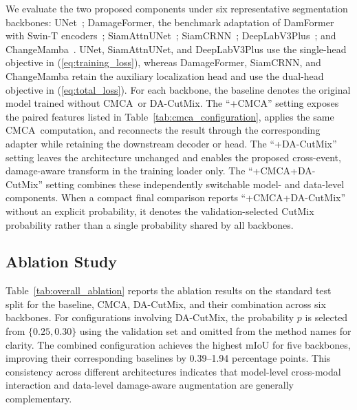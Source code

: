 \documentclass[journal]{IEEEtran}
\newcommand{\cmca}{CMCA}
\newcommand{\dacutmix}{DA-CutMix}
\begin{document}
    We evaluate the two proposed components under six representative segmentation backbones: UNet~\cite{ronneberger2015unet}; DamageFormer, the benchmark adaptation of DamFormer~\cite{chen2022damformer} with Swin-T encoders~\cite{liu2021swin}; SiamAttnUNet~\cite{adriano2021multimodal}; SiamCRNN~\cite{chen2020siamcrnn}; DeepLabV3Plus~\cite{chen2018deeplabv3plus}; and ChangeMamba~\cite{chen2024changemamba}. UNet, SiamAttnUNet, and DeepLabV3Plus use the single-head objective in (\ref{eq:training_loss}), whereas DamageFormer, SiamCRNN, and ChangeMamba retain the auxiliary localization head and use the dual-head objective in (\ref{eq:total_loss}). For each backbone, the baseline denotes the original model trained without \cmca\ or \dacutmix. The ``+\cmca'' setting exposes the paired features listed in Table~\ref{tab:cmca_configuration}, applies the same \cmca\ computation, and reconnects the result through the corresponding adapter while retaining the downstream decoder or head. The ``+\dacutmix'' setting leaves the architecture unchanged and enables the proposed cross-event, damage-aware transform in the training loader only. The ``+\cmca+\dacutmix'' setting combines these independently switchable model- and data-level components. When a compact final comparison reports ``+\cmca+\dacutmix'' without an explicit probability, it denotes the validation-selected CutMix probability rather than a single probability shared by all backbones.
    
    \subsection{Ablation Study}
    \label{subsec:ablation}
    
    Table~\ref{tab:overall_ablation} reports the ablation results on the standard test split for the baseline, \cmca, \dacutmix, and their combination across six backbones. For configurations involving \dacutmix, the probability $p$ is selected from $\{0.25,0.30\}$ using the validation set and omitted from the method names for clarity. The combined configuration achieves the highest mIoU for five backbones, improving their corresponding baselines by 0.39--1.94 percentage points. This consistency across different architectures indicates that model-level cross-modal interaction and data-level damage-aware augmentation are generally complementary.
    
\end{document}
